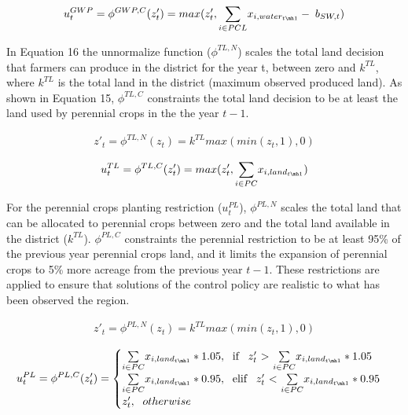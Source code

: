 \documentclass[11pt,a4paper]{article}
\begin{document}
\begin{align}
u^{GWP}_t = \phi^{GWP,C}(z'_{t})= max(z'_{t},\underset{i \in PCL}{\sum} x_{i,water_{t\mh1}} - \; b_{SW,t})
\end{align}

In Equation 16 the unnormalize function ($\phi^{TL,N}$) scales the total land decision that farmers can produce in the district for the year t, between zero and $k^{TL}$, where $k^{TL}$ is the total land in the district (maximum observed produced land). As shown in Equation 15, $\phi^{TL,C}$ constraints the total land decision to be at least the land used by perennial crops in the the year $t-1$.

\begin{align}
z'_{t} = \phi^{TL,N}(z_{t}) = k^{TL}max(min(z_{t},1),0)
\end{align}

\begin{align}
u^{TL}_t = \phi^{TL,C}(z'_{t})= max(z'_{t},\underset{i \in PC}{\sum} x_{i,land_{t\mh1}})
\end{align}

For the perennial crops planting restriction ($u^{PL}_t$), $\phi^{PL,N}$ scales the total land that can be allocated to perennial crops between zero and the total land available in the district ($k^{TL}$). $\phi^{PL,C}$ constraints the perennial restriction to be at least 95\% of the previous year perennial crops land, and it limits the expansion of perennial crops to 5\% more acreage from the previous year $t-1$. These restrictions are applied to ensure that solutions of the control policy are realistic to what has been observed the region.

\begin{align}
z'_{t} = \phi^{PL,N}(z_{t}) = k^{TL}max(min(z_{t},1),0)
\end{align}

\begin{align}
u^{PL}_t = \phi^{PL,C}(z'_{t})= \begin{cases}
      \underset{i\in{PC}}{\sum} x_{i,land_{t\mh1}}*1.05,  \text{\; if \, $z'_{t}$  $>$ $\underset{i\in PC}{\sum}x_{i,land_{t\mh1}}*1.05$}\\
       \underset{i\in PC}{\sum} x_{i,land_{t\mh1}}*0.95, \text{\; elif \, $z'_{t}$  $<$ $\underset{i\in PC}{\sum}x_{i,land_{t\mh1}}*0.95$}\\
      z'_{t}, \text{\; $otherwise$}
\end{cases}     
\end{align}
\end{document}
